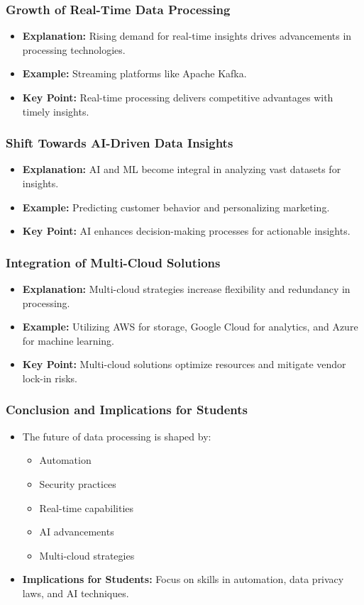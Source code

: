 \documentclass{beamer}
\begin{document}
\begin{frame}[fragile]
    \frametitle{Growth of Real-Time Data Processing}
    \begin{itemize}
        \item \textbf{Explanation:} Rising demand for real-time insights drives advancements in processing technologies.
        \item \textbf{Example:} Streaming platforms like Apache Kafka.
        \item \textbf{Key Point:} Real-time processing delivers competitive advantages with timely insights.
    \end{itemize}
\end{frame}

\begin{frame}[fragile]
    \frametitle{Shift Towards AI-Driven Data Insights}
    \begin{itemize}
        \item \textbf{Explanation:} AI and ML become integral in analyzing vast datasets for insights.
        \item \textbf{Example:} Predicting customer behavior and personalizing marketing.
        \item \textbf{Key Point:} AI enhances decision-making processes for actionable insights.
    \end{itemize}
\end{frame}

\begin{frame}[fragile]
    \frametitle{Integration of Multi-Cloud Solutions}
    \begin{itemize}
        \item \textbf{Explanation:} Multi-cloud strategies increase flexibility and redundancy in processing.
        \item \textbf{Example:} Utilizing AWS for storage, Google Cloud for analytics, and Azure for machine learning.
        \item \textbf{Key Point:} Multi-cloud solutions optimize resources and mitigate vendor lock-in risks.
    \end{itemize}
\end{frame}

\begin{frame}[fragile]
    \frametitle{Conclusion and Implications for Students}
    \begin{itemize}
        \item The future of data processing is shaped by:
        \begin{itemize}
            \item Automation
            \item Security practices
            \item Real-time capabilities
            \item AI advancements
            \item Multi-cloud strategies
        \end{itemize}
        \item \textbf{Implications for Students:} Focus on skills in automation, data privacy laws, and AI techniques.
    \end{itemize}
\end{frame}
\end{document}
